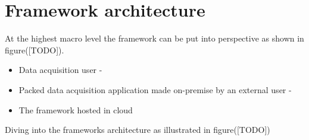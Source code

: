 \chapter{Framework architecture}
\label{chap:03}

At the highest macro level the framework can be put into perspective as shown in figure([TODO]). 
\begin{itemize}
	\item Data acquisition user -  
	\item Packed data acquisition application made on-premise by an external user - 
	\item The framework hosted in cloud
\end{itemize}

Diving into the frameworks architecture as illustrated in figure([TODO]) 

